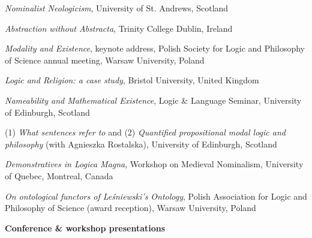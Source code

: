 \documentclass[10pt, a4paper]{article}
\newcommand{\years}[1]{\marginnote{\normalsize #1}}
\begin{document}
 \emph{Nominalist   Neologicism},  University of St. Andrews, Scotland


\vspace{0.5mm}

\emph{Abstraction without Abstracta},    Trinity College Dublin, Ireland


\vspace{0.5mm}


 \emph{Modality and Existence}, keynote address, Polish Society for Logic and Philosophy of Science annual \newline meeting,  Warsaw University, Poland


\vspace{0.5mm}



 \emph{Logic and Religion: a case study},    Bristol University, United Kingdom



\vspace{0.5mm}


\emph{Nameability and Mathematical Existence},  Logic \& Language Seminar,   University of Edinburgh, Scotland


\vspace{0.5mm}

\years{2008}
  (1) \emph{What   sentences   refer   to} and (2)
\emph{Quantified propositional modal  logic and philosophy} (with Agnieszka Rostalska),       University   of    Edinburgh,
Scotland


\vspace{0.5mm}

\pagebreak 

\years{2006} \emph{Demonstratives in Logica Magna}, Workshop on Medieval Nominalism,  University of Quebec, Montreal, Canada


\vspace{0.5mm}



 \years{2005}\emph{On ontological functors of Le{\'s}niewski's Ontology},  Polish Association for Logic and Philosophy of
Science (award reception),  Warsaw University, Poland

\vspace{1.5mm}



 {\sc \textbf{Conference \& workshop presentations}}\normalsize



\noindent

\vspace{1.5mm}
\end{document}

